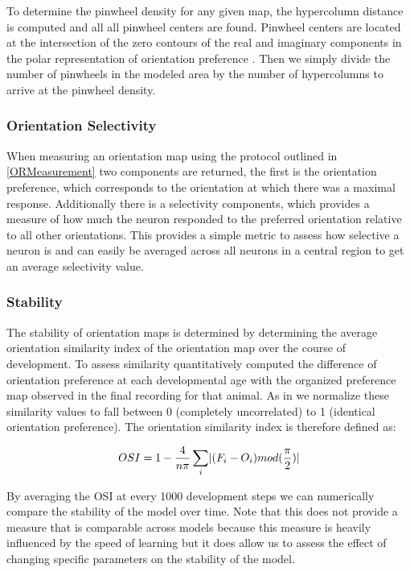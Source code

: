 To determine the pinwheel density for any given map, the hypercolumn
distance is computed and all all pinwheel centers are found. Pinwheel
centers are located at the intersection of the zero contours of the
real and imaginary components in the polar representation of
orientation preference \citep{Lowel1998}. Then we simply divide the
number of pinwheels in the modeled area by the number of hypercolumns
to arrive at the pinwheel density.

\subsubsection{Orientation Selectivity}

When measuring an orientation map using the protocol outlined in
\ref{ORMeasurement} two components are returned, the first is the
orientation preference, which corresponds to the orientation at which
there was a maximal response. Additionally there is a selectivity
components, which provides a measure of how much the neuron responded
to the preferred orientation relative to all other orientations. This
provides a simple metric to assess how selective a neuron is and can
easily be averaged across all neurons in a central region to get an
average selectivity value.

\subsubsection{Stability}

The stability of orientation maps is determined by determining the
average orientation similarity index of the orientation map over the
course of development. To assess similarity quantitatively
\cite{Chapman1996} computed the difference of orientation preference
at each developmental age with the organized preference map observed
in the final recording for that animal. As in \cite{Stevens2013} we
normalize these similarity values to fall between 0 (completely
uncorrelated) to 1 (identical orientation preference). The orientation
similarity index is therefore defined as:

\begin{equation}
  OSI = 1 - \frac{4}{n\pi} \sum_{i}\lvert(F_{i}-O_{i})mod(\frac{\pi}{2})\rvert
\end{equation}

By averaging the OSI at every 1000 development steps we can
numerically compare the stability of the model over time. Note that
this does not provide a measure that is comparable across models
because this measure is heavily influenced by the speed of learning
but it does allow us to assess the effect of changing specific
parameters on the stability of the model.

